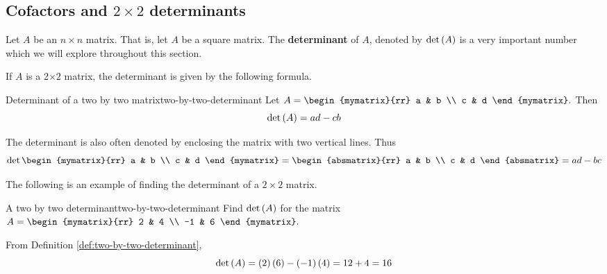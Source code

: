 \subsection{Cofactors and \texorpdfstring{$2\times 2$}{2x2} determinants}

Let $A$ be an $n\times n$ matrix. That is, let $A$ be a square matrix. The \textbf{determinant} of $A$, denoted
by $\det \left(A\right) $ is a very important number which we will explore throughout this section. 

If $A$ is a 2$\times 2$
matrix, the determinant is given by the following formula.

\begin{definition}{Determinant of a two by two matrix}{two-by-two-determinant}
Let $A=\begin{mymatrix}{rr}
a & b \\
c & d
\end{mymatrix} .$ Then
\begin{equation*}
\det \left(A\right)  = ad-cb
\end{equation*}
\end{definition}

The determinant is also often denoted by enclosing the matrix with two
vertical lines. Thus
\begin{equation*}
\det \begin{mymatrix}{rr}
a & b \\
c & d
\end{mymatrix} =\begin{absmatrix}{rr}
a & b \\
c & d
\end{absmatrix} 
=ad - bc
\end{equation*}

The following is an example of finding the determinant of a $2 \times 2$ matrix.

\begin{example}{A two by two determinant}{two-by-two-determinant}
Find $\det\left(A\right) $ for the matrix
$A =  \begin{mymatrix}{rr}
2 & 4 \\
-1 & 6
\end{mymatrix} .$
\end{example}

\begin{solution} From Definition \ref{def:two-by-two-determinant},
\begin{equation*}
\det \left(A\right) = \left(2\right) \left(6\right) -\left(
-1\right) \left(4\right) = 12 + 4 = 16
\end{equation*}
\end{solution} 

